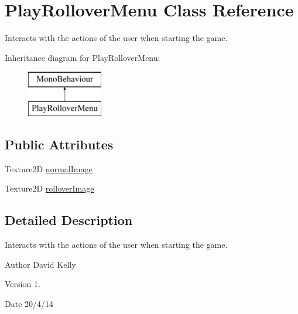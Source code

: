 \hypertarget{class_play_rollover_menu}{\section{Play\-Rollover\-Menu Class Reference}
\label{class_play_rollover_menu}
}


Interacts with the actions of the user when starting the game.  


Inheritance diagram for Play\-Rollover\-Menu\-:\begin{figure}[H]
\begin{center}
\leavevmode
\includegraphics[height=2.000000cm]{class_play_rollover_menu}
\end{center}
\end{figure}
\subsection*{Public Attributes}
\begin{DoxyCompactItemize}
\item 
Texture2\-D \hyperlink{class_play_rollover_menu_a291ee960efe64e860a910579971d7f79}{normal\-Image}
\item 
Texture2\-D \hyperlink{class_play_rollover_menu_aa523c3e0465efefc82043c174cbf7a66}{rollover\-Image}
\end{DoxyCompactItemize}


\subsection{Detailed Description}
Interacts with the actions of the user when starting the game. 

\begin{DoxyAuthor}{Author}
David Kelly 
\end{DoxyAuthor}
\begin{DoxyVersion}{Version}
1. 
\end{DoxyVersion}
\begin{DoxyDate}{Date}
20/4/14 
\end{DoxyDate}



